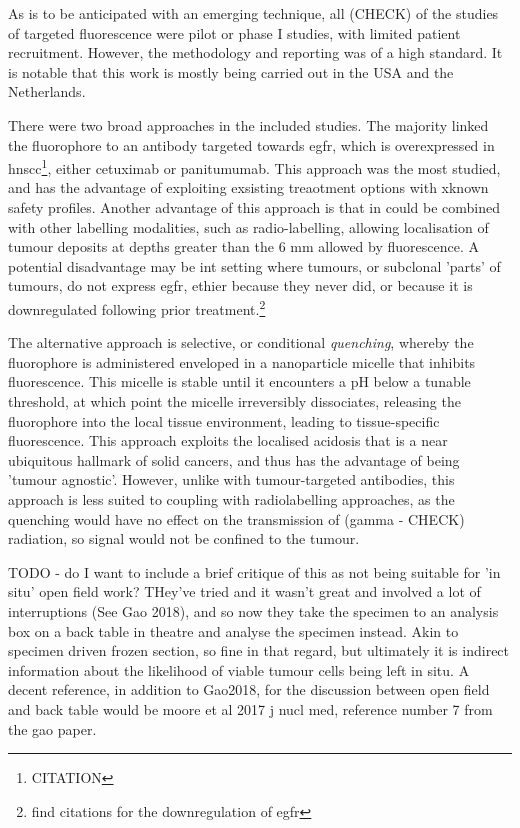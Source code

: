 As is to be anticipated with an emerging technique, all (CHECK) of the studies of targeted fluorescence were pilot or phase I studies, with limited patient recruitment. However, the methodology and reporting was of a high standard.
It is notable that this work is mostly being carried out in the USA and the Netherlands.

There were two broad approaches in the included studies. 
The majority linked the fluorophore to an antibody targeted towards \gls{egfr}, which is overexpressed in \gls{hnscc}\footnote{CITATION}, either cetuximab or panitumumab.
This approach was the most studied, and has the advantage of exploiting exsisting treaotment options with xknown safety profiles.
Another advantage of this approach is that in could be combined with other labelling modalities, such as radio-labelling, allowing localisation of tumour deposits at depths greater than the 6 mm allowed by fluorescence.
A potential disadvantage  may be int setting where tumours, or subclonal 'parts' of tumours, do not express \gls{egfr}, ethier because they never did, or because it is downregulated following prior treatment.\footnote{find citations for the downregulation of egfr}

The alternative approach is selective, or conditional \textit{quenching}, whereby the fluorophore is administered enveloped in a nanoparticle micelle that inhibits fluorescence.
This micelle is stable until it encounters a pH below a tunable threshold, at which point the micelle irreversibly dissociates, releasing the fluorophore into the local tissue environment, leading to tissue-specific fluorescence.
This approach exploits the localised acidosis that is a near ubiquitous hallmark of solid cancers, and thus has the advantage of being 'tumour agnostic'.
However, unlike with tumour-targeted antibodies, this approach is less suited to coupling with radiolabelling approaches, as the quenching would have no effect on the transmission of (gamma - CHECK) radiation, so signal would not be confined to the tumour.

TODO - do I want to include a brief critique of this as not being suitable for 'in situ' open field work? 
THey've tried and it wasn't great and involved a lot of interruptions (See Gao 2018), and so now they take the specimen to an analysis box on a back table in theatre and analyse the specimen instead. 
Akin to specimen driven frozen section, so fine in that regard, but ultimately it is indirect information about the likelihood of viable tumour cells being left in situ.
A decent reference, in addition to Gao2018, for the discussion between open field and back table would be moore et al 2017 j nucl med, reference number 7 from the gao paper.

